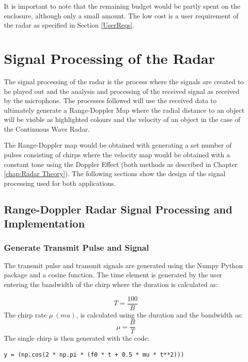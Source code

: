 It is important to note that the remaining budget would be partly spent on the enclosure, although only a small amount. The low cost is a user requirement of the radar as specified in Section \ref{UserReqs}.

\newpage
\section{Signal Processing of the Radar}
The signal processing of the radar is the process where the signals are created to be played out and the analysis and processing of the received signal as received by the microphone. The processes followed will use the received data to ultimately generate a Range-Doppler Map where the radial distance to an object will be visible as highlighted colours and the velocity of an object in the case of the Continuous Wave Radar.

The Range-Doppler map would be obtained with generating a set number of pulses consisting of chirps where the velocity map would be obtained with a constant tone using the Doppler Effect (both methods as described in Chapter \ref{chap:Radar Theory}). The following sections show the design of the signal processing used for both applications.

\subsection{Range-Doppler Radar Signal Processing and Implementation}
\subsubsection{Generate Transmit Pulse and Signal}
The transmit pulse and transmit signals are generated using the Numpy Python package and  a cosine function. The time element is generated by the user entering the bandwidth of the chirp where the duration is calculated as:

\begin{equation}
T = \frac{100}{B}
\end{equation}The chirp rate $\mu\ (mu)$, is calculated using the duration and the bandwidth as:
\begin{equation}
\mu = \frac{B}{T}
\end{equation}The single chirp is then generated with the code:
\begin{verbatim}
y = (np.cos(2 * np.pi * (f0 * t + 0.5 * mu * t**2)))
\end{verbatim} 

